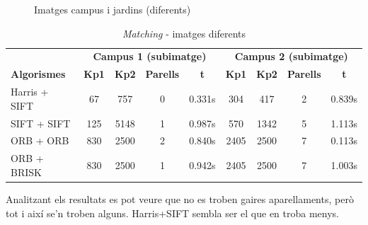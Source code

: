 		\begin{figure}[!htb]
			\caption{Imatges campus i jardins (diferents)}
		\end{figure}

		\begin{table}[H]
			\begin{center}
				\begin{tabular}{l | c c c c | c c c c}
					& \multicolumn{4}{c|}{\textbf{Campus 1 (subimatge)}} & \multicolumn{4}{c}{\textbf{Campus 2 (subimatge)}} \\
					\textbf{Algorismes} & \textbf{Kp1} & \textbf{Kp2} & \textbf{Parells} & \textbf{t} & \textbf{Kp1} & \textbf{Kp2} & \textbf{Parells} & \textbf{t} \\ \hline
					Harris + SIFT & 67 & 757 & 0 & 0.331s & 304 & 417 & 2 & 0.839s \\
					SIFT + SIFT & 125 & 5148 & 1 & 0.987s & 570 & 1342 & 5 & 1.113s \\
					ORB + ORB & 830 & 2500 & 2 & 0.840s & 2405 & 2500 & 7 & 0.113s \\
					ORB + BRISK & 830 & 2500 & 1 & 0.942s & 2405 & 2500 & 7 & 1.003s \\
				\end{tabular}
			\end{center}
			\caption{\textit{Matching} - imatges diferents}
		\end{table}
		\noindent
		Analitzant els resultats es pot veure que no es troben gaires aparellaments, però tot i així se'n troben alguns. Harris+SIFT sembla ser el que en troba menys.

